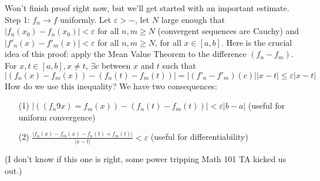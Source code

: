 \documentclass{article}
\theoremstyle{plain}
\theoremstyle{remark}
\newcommand{\ep}{{\varepsilon}}
\begin{document}
Won't finish proof right now, but we'll get started with an important estimate.
Step 1: $f_n \to f$ uniformly.
Let $\ep > -$, let $N$ large enough that $\lvert f_n(x_0) - f_n(x_0) \rvert < \ep$
for all $n,m \geq N$ (convergent sequences are Cauchy)
and $\lvert f'_n(x) - f'_m(x)\rvert < \ep$ for all $n,m \geq N$, for all $x \in [a,b]$.
Here is the crucial idea of this proof: apply the Mean Value Theorem
to the difference $(f_n - f_m)$.
For $x,t \in [a,b], x\neq t$, $\exists c$ between $x$ and $t$ such that
\[
	\lvert (f_n(x) - f_m(x)) - (f_n(t) - f_m(t)) \rvert
	= \lvert (f'_n - f'_m)(c)\rvert\lvert x - t\rvert \leq \ep \lvert x -t \rvert
\]
How do we use this inequality?
We have two consequences:
\begin{enumerate}
	\item[(1)] $|((f_n9x) = f_m(x)) - (f_n(t) - f_m(t)) | < \ep |b-a|$
		(useful for uniform convergence)
	\item[(2)] $\frac{|f_n(x) - f_m(x) - f_n(t) + f_m(t)|}{|x-t|} < \ep$
		(useful for differentiability)
\end{enumerate}
(I don't know if this one is right, some power tripping Math 101 TA kicked us out.)
\end{document}
